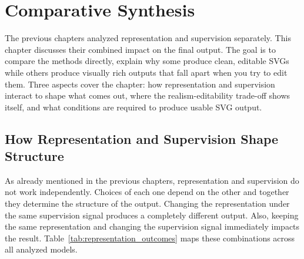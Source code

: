 \chapter{Comparative Synthesis}
\label{ch:synthesis}

The previous chapters analyzed representation and supervision 
separately. This chapter discusses their combined impact on the final output.
The goal is to compare the methods directly, explain why some 
produce clean, editable SVGs while others produce visually 
rich outputs that fall apart when you try to edit them.
Three aspects cover the chapter: how representation and 
supervision interact to shape what comes out, where the 
realism-editability trade-off shows itself, and 
what conditions are required to produce usable SVG output.


\section{How Representation and Supervision Shape Structure}
\label{sec:rep_sup_interaction}

As already mentioned in the previous chapters, 
representation and supervision do not work independently. 
Choices of each one depend on the other and together they determine the structure of the output.  
Changing the representation under the same supervision signal 
produces a completely different output. Also, keeping the same representation and changing the supervision signal 
immediately impacts the result. 
Table~\ref{tab:representation_outcomes} maps these combinations across 
all analyzed models.


